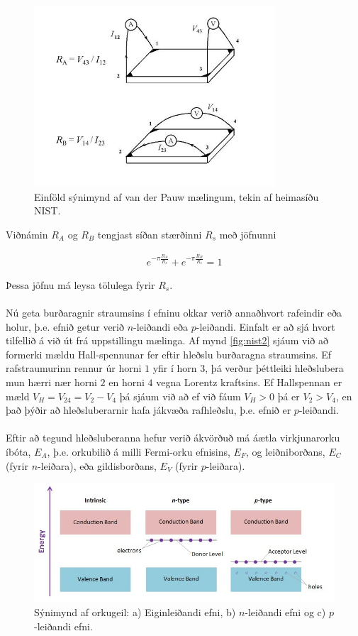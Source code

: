 \documentclass[11pt]{article}
\begin{document}
\begin{figure}[H]
\centering
	\includegraphics[width = 90mm]{fig2.jpg}
	\caption{Einföld sýnimynd af van der Pauw mælingum, tekin af heimasíðu NIST.}
	\label{fig:nist3}
\end{figure}

Viðnámin $R_A$ og $R_B$ tengjast síðan stærðinni $R_s$ með jöfnunni

\begin{align}
e^{-\pi \frac{R_A}{R_s}} + e^{-\pi \frac{R_B}{R_s}} = 1
\end{align}

Þessa jöfnu má leysa tölulega fyrir $R_s$.\\
\\
Nú geta burðaragnir straumsins í efninu okkar verið annaðhvort rafeindir eða holur, þ.e. efnið getur verið $n$-leiðandi eða $p$-leiðandi. Einfalt er að sjá hvort tilfellið á við út frá uppstillingu mælinga. Af mynd \ref{fig:nist2} sjáum við að formerki mældu Hall-spennunar fer eftir hleðslu burðaragna straumsins. Ef rafstraumurinn rennur úr horni $1$ yfir í horn $3$, þá verður þéttleiki hleðslubera mun hærri nær horni $2$ en horni $4$ vegna Lorentz kraftsins. Ef Hallspennan er mæld $V_H = V_{24} = V_2 - V_4$ þá sjáum við að ef við fáum $V_H > 0$ þá er $V_2 > V_4$, en það þýðir að hleðsluberarnir hafa jákvæða rafhleðslu, þ.e. efnið er $p$-leiðandi. \\
\\
Eftir að tegund hleðsluberanna hefur verið ákvörðuð má áætla virkjunarorku íbóta, $E_A$, þ.e. orkubilið á milli Fermi-orku efnisins, $E_F$, og leiðniborðans, $E_C$ (fyrir $n$-leiðara), eða gildisborðans, $E_V$ (fyrir $p$-leiðara). 

\begin{figure}[H]
\centering
	\includegraphics[width = 130mm]{nptype.jpg}
	\caption{Sýnimynd af orkugeil: a) Eiginleiðandi efni, b) $n$-leiðandi efni og c) $p$-leiðandi efni.}
	\label{fig:Bandgap}
\end{figure}
\end{document}

